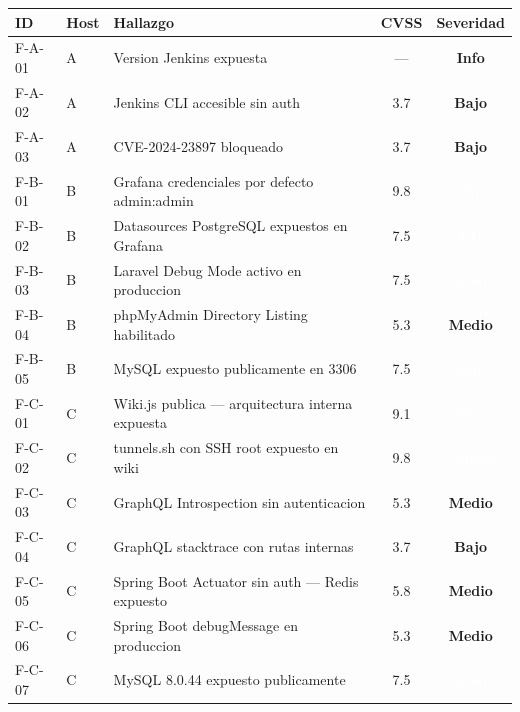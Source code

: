 \documentclass[11pt,a4paper]{article}
\begin{document}
\begin{center}
\begin{tabularx}{\textwidth}{llXcc}
\toprule
\textbf{ID} & \textbf{Host} & \textbf{Hallazgo} & \textbf{CVSS} & \textbf{Severidad} \\
\midrule
F-A-01 & A & Version Jenkins expuesta                          & ---  & \cellcolor{lightgray}\textbf{Info} \\
F-A-02 & A & Jenkins CLI accesible sin auth                    & 3.7  & \cellcolor{low!40}\textbf{Bajo} \\
F-A-03 & A & CVE-2024-23897 bloqueado                          & 3.7  & \cellcolor{low!40}\textbf{Bajo} \\
F-B-01 & B & Grafana credenciales por defecto admin:admin      & 9.8  & \cellcolor{critical!80}\textcolor{white}{\textbf{Critico}} \\
F-B-02 & B & Datasources PostgreSQL expuestos en Grafana       & 7.5  & \cellcolor{high!70}\textcolor{white}{\textbf{Alto}} \\
F-B-03 & B & Laravel Debug Mode activo en produccion           & 7.5  & \cellcolor{high!70}\textcolor{white}{\textbf{Alto}} \\
F-B-04 & B & phpMyAdmin Directory Listing habilitado           & 5.3  & \cellcolor{medium!60}\textbf{Medio} \\
F-B-05 & B & MySQL expuesto publicamente en 3306               & 7.5  & \cellcolor{high!70}\textcolor{white}{\textbf{Alto}} \\
F-C-01 & C & Wiki.js publica --- arquitectura interna expuesta & 9.1  & \cellcolor{critical!80}\textcolor{white}{\textbf{Critico}} \\
F-C-02 & C & tunnels.sh con SSH root expuesto en wiki          & 9.8  & \cellcolor{critical!80}\textcolor{white}{\textbf{Critico}} \\
F-C-03 & C & GraphQL Introspection sin autenticacion           & 5.3  & \cellcolor{medium!60}\textbf{Medio} \\
F-C-04 & C & GraphQL stacktrace con rutas internas             & 3.7  & \cellcolor{low!40}\textbf{Bajo} \\
F-C-05 & C & Spring Boot Actuator sin auth --- Redis expuesto  & 5.8  & \cellcolor{medium!60}\textbf{Medio} \\
F-C-06 & C & Spring Boot debugMessage en produccion            & 5.3  & \cellcolor{medium!60}\textbf{Medio} \\
F-C-07 & C & MySQL 8.0.44 expuesto publicamente                & 7.5  & \cellcolor{high!70}\textcolor{white}{\textbf{Alto}} \\

\end{tabularx}
\end{center}
\end{document}

